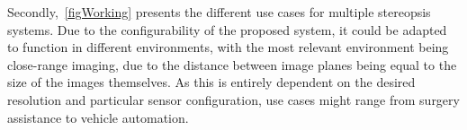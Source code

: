 Secondly,~\ref{figWorking} presents the different use cases for multiple stereopsis systems. Due to
the configurability of the proposed system, it could be adapted to function in different environments,
with the most relevant environment being close-range imaging, due to the distance between image planes
being equal to the size of the images themselves. As this is entirely dependent on the desired resolution
and particular sensor configuration, use cases might range from surgery assistance to vehicle automation.